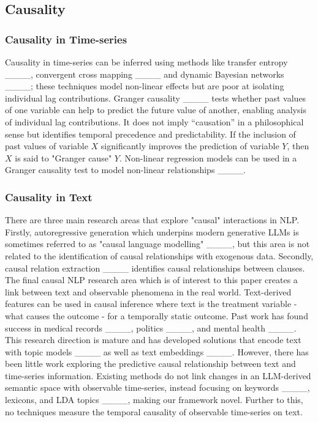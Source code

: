 \subsection{Causality}
\label{sec:causality}

\subsubsection{Causality in Time-series}
\label{sec:caus_in_TS}

Causality in time-series can be inferred using methods like transfer entropy ____, convergent cross mapping ____ and dynamic Bayesian networks ____; these techniques model non-linear effects but are poor at isolating individual lag contributions. Granger causality ____ tests whether past values of one variable can help to predict the future value of another, enabling analysis of individual lag contributions. It does not imply “causation” in a philosophical sense but identifies temporal precedence and predictability. If the inclusion of past values of variable $X$ significantly improves the prediction of variable $Y$, then $X$ is said to "Granger cause" $Y$. Non-linear regression models can be used in a Granger causality test to model non-linear relationships ____.
\vspace{-0.1cm}

\subsubsection{Causality in Text}
\label{sec:cause_in_text}

There are three main research areas that explore "causal" interactions in NLP. Firstly, autoregressive generation which underpins modern generative LLMs is sometimes referred to as "causal language modelling" ____, but this area is not related to the identification of causal relationships with exogenous data. Secondly, causal relation extraction ____ identifies causal relationships between clauses. The final causal NLP research area which is of interest to this paper creates a link between text and observable phenomena in the real world. Text-derived features can be used in causal inference where text is the treatment variable - what causes the outcome - for a temporally static outcome. Past work has found success in medical records ____, politics ____, and mental health ____. This research direction is mature and has developed solutions that encode text with topic models ____ as well as text embeddings ____. However, there has been little work exploring the predictive causal relationship between text and time-series information. Existing methods do not link changes in an LLM-derived semantic space with observable time-series, instead focusing on keywords ____, lexicons, and LDA topics ____, making our framework novel. Further to this, no techniques measure the temporal causality of observable time-series on text.
\vspace{-0.1cm}